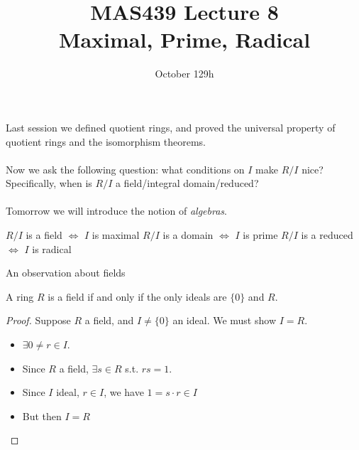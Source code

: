 \documentclass{beamer}
\title{MAS439 Lecture 8 \\ Maximal, Prime, Radical}
\date{October 129h}
\begin{document}
\begin{frame}
\titlepage
\end{frame}


\begin{frame}{}

Last session we defined quotient rings, and proved the universal property of quotient rings and the isomorphism theorems. \\~\\

Now we ask the following question: what conditions on $I$ make $R/I$ nice?  Specifically, when is $R/I$ a field/integral domain/reduced?  \\~\\

Tomorrow we will introduce the notion of \emph{algebras}.


\end{frame}

\begin{frame}[plain, c]

\huge
\begin{center}


{ $R/I$ is a field $\iff$ $I$ is maximal}
$R/I$ is a domain $\iff$ $I$ is prime
$R/I$ is a reduced $\iff$ $I$ is radical

\end{center}
\end{frame}


\begin{frame}{An observation about fields}

\begin{lemma} A ring $R$ is a field if and only if the only ideals are $\{0\}$ and $R$.
\end{lemma}

\begin{proof}
Suppose $R$ a field, and $I\neq\{0\}$ an ideal.  We must show $I=R$.

\begin{itemize}
\item $\exists 0 \neq r\in I$. 

\item  Since $R$ a field, $\exists s\in R$ s.t. $rs=1$.

\item Since $I$ ideal, $r\in I$, we have $1=s\cdot r\in I$

\item But then $I=R$

\end{itemize}
\end{proof}
\end{frame}
\end{document}
